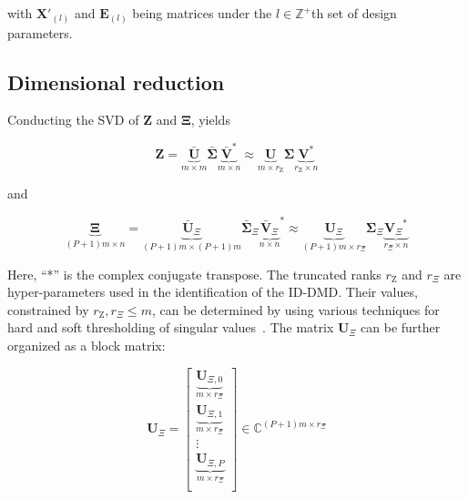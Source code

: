 \noindent with ${\mathbf{X'}_{(l)}}$ and ${\mathbf{E}_{(l)}}$ being matrices under the $l\in {\mathbb{Z}^{+}}$th set of design parameters.

\subsection{Dimensional reduction}
Conducting the SVD of $\mathbf{Z}$ and $\mathbf{\Xi}$, yields

\begin{equation}
    \mathbf{Z} =\underbrace{\mathbf{\bar{U}}}_{m\times m}\mathbf{\bar\Sigma }\underbrace{\mathbf{\bar{V}}^\text{*}}_{m\times n}\approx \underbrace{\mathbf{U}}_{m\times {r}_{\text{Z}}}\mathbf{\Sigma }\underbrace{\mathbf{V}^\text{*}}_{{{r}_{\text{Z}}}\times n} \label{eqS5}
\end{equation}

\noindent and

\begin{equation}
    \underbrace{\mathbf{\Xi}}_{(P+1)m\times n}=\underbrace{\mathbf{\bar{U}}_{\Xi}}_{(P+1)m\times (P+1)m}{\mathbf{\bar\Sigma}_{\Xi}}{{\underbrace{\mathbf{\bar{V}}_{\Xi}}_{n\times n}}^\text{*}}\approx \underbrace{\mathbf{U}_{\Xi}}_{(P+1)m\times {r_{\Xi}}}{\mathbf{\Sigma}_{\Xi}}\underbrace{{\mathbf{V}_{\Xi}}^\text{*}}_{{{r}_{\Xi}}\times n} \label{eqS6}
\end{equation}

\noindent Here, “*” is the complex conjugate transpose. The truncated ranks ${r}_{\text{Z}}$ and ${r}_{\Xi}$ are hyper-parameters used in the identification of the ID-DMD. Their values, constrained by ${r}_{\text{Z}},{r}_{\Xi}\le m$, can be determined by using various techniques for hard and soft thresholding of singular values~\cite{gavish2014optimal,brunton2022data}. The matrix $\mathbf{U}_{\Xi}$ can be further organized as a block matrix:

\begin{equation*}
    \mathbf{U}_{\Xi}=\left[\begin{matrix}
    \underbrace{\mathbf{U}_{\Xi,0}}_{m\times {{r}_{\Xi}}} \\
    \underbrace{\mathbf{U}_{\Xi,1}}_{m\times {{r}_{\Xi}}} \\
    \vdots \\
    \underbrace{\mathbf{U}_{\Xi,P}}_{m\times {{r}_{\Xi}}} \\
    \end{matrix} \right]\in {\mathbb{C}^{(P+1)m\times {{r}_{\Xi}}}}
\end{equation*}

